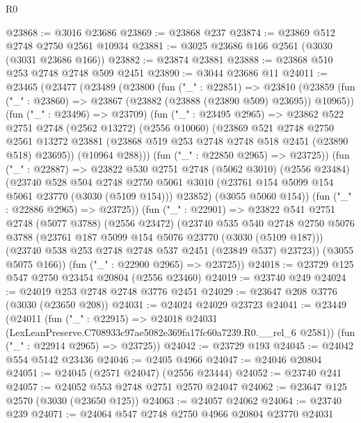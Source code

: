 \begin{lexlean}{R0}
\begin{coremodule}
@23868 := @3016 @23686
@23869 := @23868 @237
@23874 := @23869 @512 @2748 @2750 @2561 @10934
@23881 := @3025 @23686 @166 @2561 (@3030 (@3031 @23686 @166))
@23882 := @23874 @23881
@23888 := @23868 @510 @253 @2748 @2748 @509 @2451
@23890 := @3044 @23686 @11
@24011 := @23465
    (@23477
      (@23489
        (@23800
          (fun ("_" : @22851) =>
          @23810
            (@23859 (fun ("_" : @23860) => @23867 (@23882 (@23888 (@23890 @509) @23695)) @10965))
            (fun ("_" : @23496) => @23709)
            (fun ("_" : @23495 @2965) =>
            @23862
              @522
              @2751
              @2748
              (@2562 @13272)
              (@2556 @10060)
              (@23869
                @521
                @2748
                @2750
                @2561
                @13272
                @23881
                (@23868 @519 @253 @2748 @2748 @518 @2451 (@23890 @518) @23695))
              (@10964 @288)))
          (fun ("_" : @22850 @2965) => @23725))
        (fun ("_" : @22887) =>
        @23822
          @530
          @2751
          @2748
          (@5062 @3010)
          (@2556 @23484)
          (@23740
            @528
            @504
            @2748
            @2750
            @5061
            @3010
            (@23761 @154 @5099 @154 @5061 @23770 (@3030 (@5109 @154)))
            @23852)
          (@3055 @5060 @154))
        (fun ("_" : @22886 @2965) => @23725))
      (fun ("_" : @22901) =>
      @23822
        @541
        @2751
        @2748
        (@5077 @3788)
        (@2556 @23472)
        (@23740
          @535
          @540
          @2748
          @2750
          @5076
          @3788
          (@23761 @187 @5099 @154 @5076 @23770 (@3030 (@5109 @187)))
          (@23740 @538 @253 @2748 @2748 @537 @2451 (@23849 @537) @23723))
        (@3055 @5075 @166))
      (fun ("_" : @22900 @2965) => @23725))
@24018 := @23729 @125 @547 @2750 @23454 @20804 (@2556 @23460)
@24019 := @23740 @249
@24024 := @24019 @253 @2748 @2748 @3776 @2451
@24029 := @23647 @208 @3776 (@3030 (@23650 @208))
@24031 := @24024 @24029 @23723
@24041 := @23449
    (@24011
      (fun ("_" : @22915) =>
      @24018 @24031 (LexLeanPreserve.C708933c97ae5082e369fa17fc60a7239.R0.__rel_6 @2581))
      (fun ("_" : @22914 @2965) => @23725))
@24042 := @23729 @193
@24045 := @24042 @554 @5142 @23436
@24046 := @2405 @4966
@24047 := @24046 @20804
@24051 := @24045 (@2571 @24047) (@2556 @23444)
@24052 := @23740 @241
@24057 := @24052 @553 @2748 @2751 @2570 @24047
@24062 := @23647 @125 @2570 (@3030 (@23650 @125))
@24063 := @24057 @24062
@24064 := @23740 @239
@24071 := @24064 @547 @2748 @2750 @4966 @20804 @23770 @24031

\end{coremodule}
\end{lexlean}
